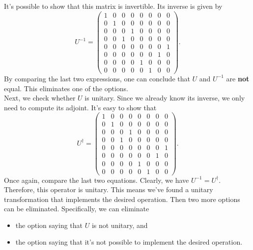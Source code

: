 \documentclass[10pt]{article}
\begin{document}
It's possible to show that this matrix is invertible. Its inverse is given by
\begin{equation}
U^{-1}=
  \begin{pmatrix}
    1 & 0 & 0 & 0 & 0 & 0 & 0 & 0\\
    0 & 1 & 0 & 0 & 0 & 0 & 0 & 0\\
    0 & 0 & 0 & 1 & 0 & 0 & 0 & 0\\
    0 & 0 & 1 & 0 & 0 & 0 & 0 & 0\\
    0 & 0 & 0 & 0 & 0 & 0 & 0 & 1\\
    0 & 0 & 0 & 0 & 0 & 0 & 1 & 0\\
    0 & 0 & 0 & 0 & 1 & 0 & 0 & 0\\
    0 & 0 & 0 & 0 & 0 & 1 & 0 & 0
  \end{pmatrix}.
\end{equation}
By comparing the last two expressions, one can conclude that \(U\) and
\(U^{-1}\) are \textbf{not} equal. This eliminates one of the options.\\
Next, we check whether \(U\) is unitary. Since we already know its inverse, we
only need to compute its adjoint. It's easy to show that
\begin{equation}
U^{\dagger}=
  \begin{pmatrix}
    1 & 0 & 0 & 0 & 0 & 0 & 0 & 0\\
    0 & 1 & 0 & 0 & 0 & 0 & 0 & 0\\
    0 & 0 & 0 & 1 & 0 & 0 & 0 & 0\\
    0 & 0 & 1 & 0 & 0 & 0 & 0 & 0\\
    0 & 0 & 0 & 0 & 0 & 0 & 0 & 1\\
    0 & 0 & 0 & 0 & 0 & 0 & 1 & 0\\
    0 & 0 & 0 & 0 & 1 & 0 & 0 & 0\\
    0 & 0 & 0 & 0 & 0 & 1 & 0 & 0
  \end{pmatrix}.
\end{equation}
Once again, compare the last two equations. Clearly, we have
\(U^{-1}=U^{\dagger}\). Therefore, this operator is unitary. This means we've
found a unitary transformation that implements the desired operation.
Then two more options can be eliminated. Specifically, we can eliminate
\begin{itemize}
\item the option saying that \(U\) is not unitary, and
\item the option saying that it's not possible to implement the desired operation.
\end{itemize}
\end{document}
